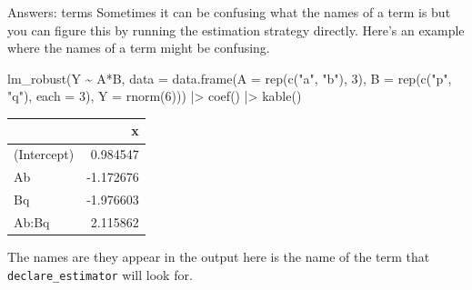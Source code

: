\documentclass[
  11pt,
  ignorenonframetext,
]{beamer}
\newenvironment{Shaded}{\begin{snugshade}}{\end{snugshade}}
\newcommand{\AttributeTok}[1]{\textcolor[rgb]{0.40,0.45,0.13}{#1}}
\newcommand{\DecValTok}[1]{\textcolor[rgb]{0.68,0.00,0.00}{#1}}
\newcommand{\FunctionTok}[1]{\textcolor[rgb]{0.28,0.35,0.67}{#1}}
\newcommand{\NormalTok}[1]{\textcolor[rgb]{0.00,0.23,0.31}{#1}}
\newcommand{\SpecialCharTok}[1]{\textcolor[rgb]{0.37,0.37,0.37}{#1}}
\newcommand{\StringTok}[1]{\textcolor[rgb]{0.13,0.47,0.30}{#1}}
\begin{document}
\begin{frame}[fragile]{Answers: terms}
\protect\hypertarget{answers-terms-1}{}
Sometimes it can be confusing what the names of a term is but you can
figure this by running the estimation strategy directly. Here's an
example where the names of a term might be confusing.

\begin{Shaded}
\begin{Highlighting}[]
\FunctionTok{lm\_robust}\NormalTok{(Y }\SpecialCharTok{\textasciitilde{}}\NormalTok{ A}\SpecialCharTok{*}\NormalTok{B, }
          \AttributeTok{data =} \FunctionTok{data.frame}\NormalTok{(}\AttributeTok{A =} \FunctionTok{rep}\NormalTok{(}\FunctionTok{c}\NormalTok{(}\StringTok{"a"}\NormalTok{,  }\StringTok{"b"}\NormalTok{), }\DecValTok{3}\NormalTok{), }
                            \AttributeTok{B =} \FunctionTok{rep}\NormalTok{(}\FunctionTok{c}\NormalTok{(}\StringTok{"p"}\NormalTok{, }\StringTok{"q"}\NormalTok{), }\AttributeTok{each =} \DecValTok{3}\NormalTok{), }
                            \AttributeTok{Y =} \FunctionTok{rnorm}\NormalTok{(}\DecValTok{6}\NormalTok{))) }\SpecialCharTok{|\textgreater{}}
  \FunctionTok{coef}\NormalTok{() }\SpecialCharTok{|\textgreater{}} \FunctionTok{kable}\NormalTok{()}
\end{Highlighting}
\end{Shaded}

\begin{tabular}{l|r}
\hline
  & x\\
\hline
(Intercept) & 0.984547\\
\hline
Ab & -1.172676\\
\hline
Bq & -1.976603\\
\hline
Ab:Bq & 2.115862\\
\hline
\end{tabular}

The names are they appear in the output here is the name of the term
that \texttt{declare\_estimator} will look for.
\end{frame}
\end{document}
